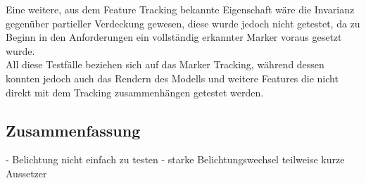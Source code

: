 Eine weitere, aus dem Feature Tracking bekannte Eigenschaft wäre die Invarianz gegenüber partieller Verdeckung gewesen, diese wurde jedoch nicht getestet, da zu Beginn in den Anforderungen ein vollständig erkannter Marker voraus gesetzt wurde.\\
All diese Testfälle beziehen sich auf das Marker Tracking, während dessen konnten jedoch auch das Rendern des Modells und weitere Features die nicht direkt mit dem Tracking zusammenhängen getestet werden.\\

\subsection{Zusammenfassung}
- Belichtung nicht einfach zu testen
- starke Belichtungswechsel teilweise kurze Aussetzer


